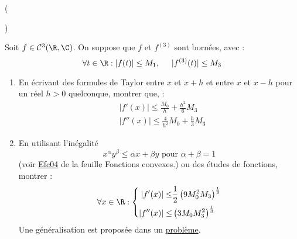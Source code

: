 \begin{tiny}()\end{tiny}
Soit $f\in \mathcal C^3(\R,\C)$. On suppose que $f$ et $f^{(3)}$ sont bornées, avec :
\begin{displaymath}
 \forall t\in \R : |f(t)|\leq M_1,\hspace{0.5cm}|f^{(3)}(t)|\leq M_3
\end{displaymath}
\begin{enumerate}
 \item 
En écrivant des formules de Taylor entre $x$ et $x+h$ et entre $x$ et $x-h$ pour un réel $h>0$ quelconque, montrer que, :
\begin{align*}
 &|f'(x)| \leq \frac{M_0}{h}+\frac{h^2}{6}M_3\\
 & |f''(x)| \leq \frac{4}{h^2}M_0 + \frac{h}{3}M_3
\end{align*}
\item En utilisant l'inégalité
\begin{displaymath}
 x^\alpha y^\beta \leq \alpha x + \beta y \text{ pour } \alpha + \beta =1
\end{displaymath}
(voir \hyperref{\baseurl temptex/fextl.pdf}{exo}{Efc04}{Efc04} de la feuille Fonctions convexes.) ou des études de fonctions, montrer :
\begin{displaymath}
 \forall x\in \R :
\left\lbrace 
\begin{aligned}
 |f'(x)|\leq& \frac{1}{2}\left(9M_0^2M_3\right)^{\frac{1}{3}}\\ 
 |f''(x)|\leq& \left( 3M_0 M_3^2\right)^{\frac{1}{3}} 
\end{aligned}
\right. 
\end{displaymath}
Une généralisation est proposée dans un \href{\baseurl devoirs\_nicolair/Aderbor.pdf}{problème}.
\end{enumerate}


